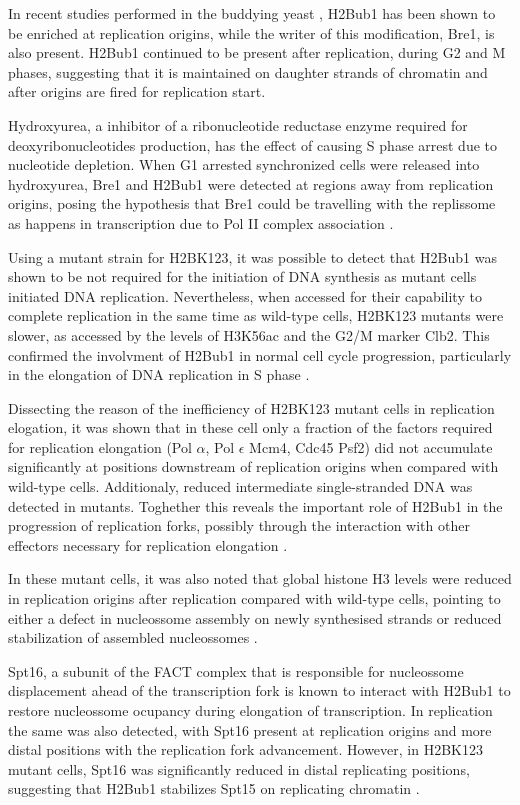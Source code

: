 \documentclass[11pt,twoside,a4paper]{report}
\begin{document}
		In recent studies performed in the buddying yeast  \cite{Trujillo2012}, H2Bub1 has been shown to be enriched at replication origins, while the writer of this modification, Bre1, is also present. H2Bub1 continued to be present after replication, during G2 and M phases, suggesting that it is maintained on daughter strands of chromatin and after origins are fired for replication start.
		
		Hydroxyurea, a inhibitor of a ribonucleotide reductase enzyme required for deoxyribonucleotides production, has the effect of causing S phase arrest due to nucleotide depletion. When G1 arrested synchronized cells were released into hydroxyurea, Bre1 and H2Bub1 were detected at regions away from replication origins, posing the hypothesis that Bre1 could be travelling with the replissome as happens in transcription due to Pol II complex association \cite{Trujillo2012}.
		
		Using a mutant strain for H2BK123, it was possible to detect that H2Bub1 was shown to be not required for the initiation of DNA synthesis as mutant cells initiated DNA replication. Nevertheless, when accessed for their capability to complete replication in the same time as wild-type cells, H2BK123 mutants were slower, as accessed by the levels of H3K56ac and the G2/M marker Clb2. This confirmed the involvment of H2Bub1 in normal cell cycle progression, particularly in the elongation of DNA replication in S phase \cite{Trujillo2012}.
		
		Dissecting the reason of the inefficiency of H2BK123 mutant cells in replication elogation, it was shown that in these cell only a fraction of the factors required for replication elongation (Pol $\alpha$, Pol $\epsilon$ Mcm4, Cdc45 Psf2) did not accumulate significantly at positions downstream of replication origins when compared with wild-type cells. Additionaly, reduced intermediate single-stranded DNA was detected in mutants. Toghether this reveals the important role of H2Bub1 in the progression of replication forks, possibly through the interaction with other effectors necessary for replication elongation \cite{Trujillo2012}.
		
		In these mutant cells, it was also noted that global histone H3 levels were reduced in replication origins after replication compared with wild-type cells, pointing to either a defect in nucleossome assembly on newly synthesised strands or reduced stabilization of assembled nucleossomes \cite{Trujillo2012}.
		
		Spt16, a subunit of the FACT complex that is responsible for nucleossome displacement ahead of the transcription fork is known to interact with H2Bub1 to restore nucleossome ocupancy during elongation of transcription. In replication the same was also detected, with Spt16 present at replication origins and more distal positions with the replication fork advancement. However, in H2BK123 mutant cells, Spt16 was significantly reduced in distal replicating positions, suggesting that H2Bub1 stabilizes Spt15 on replicating chromatin \cite{Trujillo2012}.
		
\end{document}
